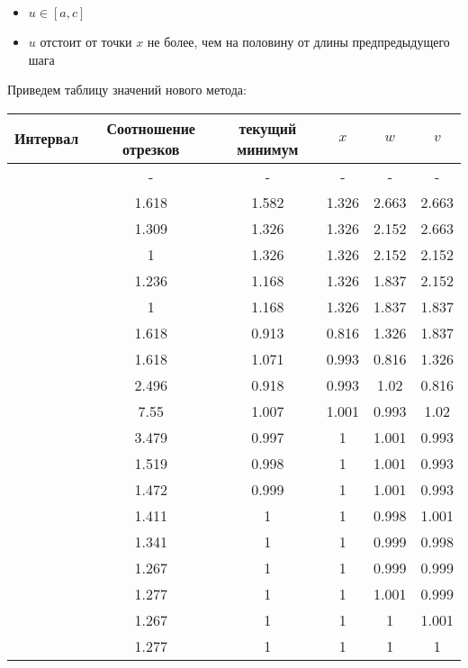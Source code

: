 \documentclass[a4paper, 14pt]{article}
\begin{document}
	  \begin{itemize}
		\item $u \in [a, c]$
		\item $u$ отстоит от точки $x$ не более, чем на половину от длины предпредыдущего шага
			
	\end{itemize}
	
	Приведем таблицу значений нового метода: \\
	
	\begin{tabular}{|c |c| c| c| c| c|}
		\hline
		Интервал & Соотношение отрезков & текущий минимум & $x$ & $w$ & $v$\\
		\hline
		[0.5, 4] & - & -& - & -& - \\
		\hline
[0.5, 2.663] & 1.618 & 1.582 & 1.326 & 2.663 & 2.663\\
\hline
[0.5, 2.152] & 1.309 & 1.326 & 1.326 & 2.152 & 2.663\\
\hline
[0.5, 2.152] & 1 & 1.326 & 1.326 & 2.152 & 2.152\\
\hline
[0.5, 1.837] & 1.236 & 1.168 & 1.326 & 1.837 & 2.152\\
\hline
[0.5, 1.837] & 1 & 1.168 & 1.326 & 1.837 & 1.837\\
\hline
[0.5, 1.326] & 1.618 & 0.913 & 0.816 & 1.326 & 1.837\\
\hline
[0.816, 1.326] & 1.618 & 1.071 & 0.993 & 0.816 & 1.326\\
\hline
[0.816, 1.02] & 2.496 & 0.918 & 0.993 & 1.02 & 0.816\\
\hline
[0.993, 1.02] & 7.55 & 1.007 & 1.001 & 0.993 & 1.02\\
\hline
[0.993, 1.001] & 3.479 & 0.997 & 1 & 1.001 & 0.993\\
\hline
[0.996, 1.001] & 1.519 & 0.998 & 1 & 1.001 & 0.993\\
\hline
[0.997, 1.001] & 1.472 & 0.999 & 1 & 1.001 & 0.993\\
\hline
[0.998, 1.001] & 1.411 & 1 & 1 & 0.998 & 1.001\\
\hline
[0.999, 1.001] & 1.341 & 1 & 1 & 0.999 & 0.998\\
\hline
[0.999, 1.001] & 1.267 & 1 & 1 & 0.999 & 0.999\\
\hline
[0.999, 1.001] & 1.277 & 1 & 1 & 1.001 & 0.999\\
\hline
[1, 1.001] & 1.267 & 1 & 1 & 1 & 1.001\\
\hline
[1, 1] & 1.277 & 1 & 1 & 1 & 1\\
\hline
	\end{tabular} \\\\
	
\end{document}
